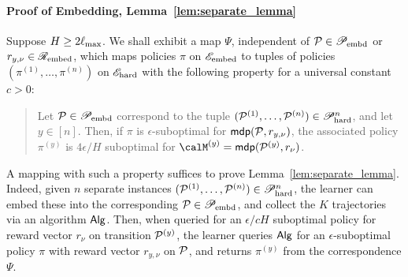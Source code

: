 \paragraph{Proof of Embedding, Lemma~\ref{lem:separate_lemma}} Suppose $H \ge 2\ell_{\max}$. We shall exhibit a map $\Psi$, independent of $\mathcal{P} \in \mathscr{P}_{\mathrm{embd}}$ or $r_{y,\nu} \in \mathscr{R}_{\mathrm{embed}}$,  which maps policies $\pi$ on $\mathscr{E}_{\mathrm{embed}}$  to tuples of policies $(\pi^{(1)},\dots,\pi^{(n)})$ on $\mathscr{E}_{\mathrm{hard}}$ with the following property for a universal constant $c > 0$: 
\begin{quote} 
Let $\mathcal{P} \in \mathscr{P}_{\mathrm{embd}}$ correspond to the tuple $(\mathcal{P}^{(1)},\dots,\mathcal{P}^{(n)}) \in \mathscr{P}_{\mathrm{hard}}^n$, and let $y \in [n]$. Then, if $\pi$ is $\epsilon$-suboptimal for $\mathsf{mdp}(\mathcal{P},r_{y,\nu})$, the associated policy $\pi^{(y)}$ is $4\epsilon/H$ suboptimal for $\calM^{(y)} = \mdp(\calP^{(y)},r_{\nu})$. 
\end{quote}

A mapping with such a property suffices to prove Lemma~\ref{lem:separate_lemma}. Indeed, given $n$ separate instances $(\mathcal{P}^{(1)},\dots,\mathcal{P}^{(n)}) \in \mathscr{P}_{\mathrm{hard}}^n$, the learner can embed these into the corresponding $\mathcal{P} \in \mathscr{P}_{\mathrm{embd}}$, and collect the $K$ trajectories via an algorithm $\mathsf{Alg}$. Then, when queried for an $\epsilon/cH$ suboptimal policy for reward vector $r_{\nu}$ on transition $\mathcal{P}^{(y)}$, the learner queries $\mathsf{Alg}$ for an $\epsilon$-suboptimal policy $\pi$ with reward vector $r_{y,\nu}$ on $\mathcal{P}$, and returns $\pi^{(y)}$ from the correspondence $\Psi$.

